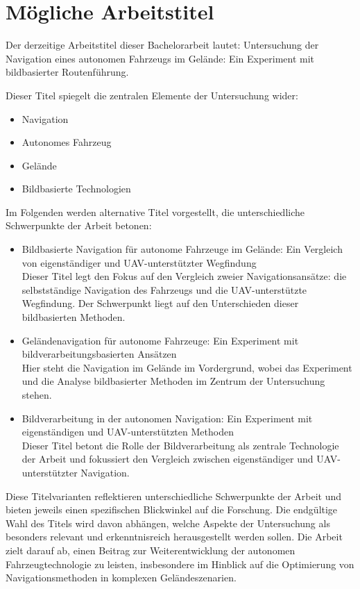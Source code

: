 \section{Mögliche Arbeitstitel}

Der derzeitige Arbeitstitel dieser Bachelorarbeit lautet: 
Untersuchung der Navigation eines autonomen Fahrzeugs im Gelände: Ein Experiment mit bildbasierter Routenführung.

Dieser Titel spiegelt die zentralen Elemente der Untersuchung wider:
\begin{itemize}
    \item Navigation
    \item Autonomes Fahrzeug
    \item Gelände
    \item Bildbasierte Technologien
\end{itemize}

Im Folgenden werden alternative Titel vorgestellt, die unterschiedliche Schwerpunkte der Arbeit betonen:

\begin{itemize}
    \item Bildbasierte Navigation für autonome Fahrzeuge im Gelände: Ein Vergleich von eigenständiger und UAV-unterstützter Wegfindung\\
    Dieser Titel legt den Fokus auf den Vergleich zweier Navigationsansätze: 
    die selbstständige Navigation des Fahrzeugs und die UAV-unterstützte Wegfindung. 
    Der Schwerpunkt liegt auf den Unterschieden dieser bildbasierten Methoden.

    \item Geländenavigation für autonome Fahrzeuge: Ein Experiment mit bildverarbeitungsbasierten Ansätzen\\
    Hier steht die Navigation im Gelände im Vordergrund, wobei das Experiment und die Analyse bildbasierter Methoden im Zentrum der Untersuchung stehen.

    \item Bildverarbeitung in der autonomen Navigation: Ein Experiment mit eigenständigen und UAV-unterstützten Methoden\\
    Dieser Titel betont die Rolle der Bildverarbeitung als zentrale Technologie der Arbeit und fokussiert den Vergleich zwischen eigenständiger und UAV-unterstützter Navigation.
\end{itemize}

Diese Titelvarianten reflektieren unterschiedliche Schwerpunkte der Arbeit und bieten jeweils einen spezifischen Blickwinkel auf die Forschung. 
Die endgültige Wahl des Titels wird davon abhängen, welche Aspekte der Untersuchung als besonders relevant und erkenntnisreich herausgestellt werden sollen. 
Die Arbeit zielt darauf ab, einen Beitrag zur Weiterentwicklung der autonomen Fahrzeugtechnologie zu leisten, insbesondere im Hinblick auf die Optimierung von Navigationsmethoden in komplexen Geländeszenarien.

